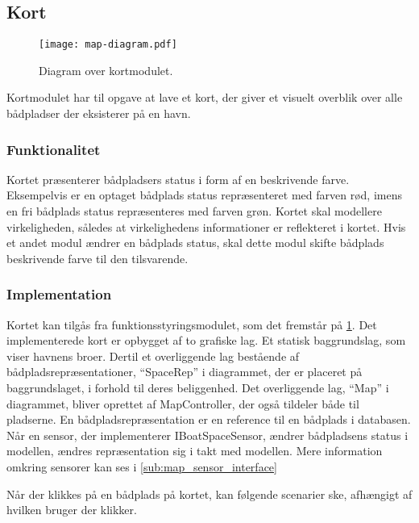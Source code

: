 \subsection{Kort}
\label{sub:kort}

\begin{figure}
  \centering
  \texttt{[image: map-diagram.pdf]}
  \caption{Diagram over kortmodulet.}
  \label{fig:map_diagram}
\end{figure}

Kortmodulet har til opgave at lave et kort, der giver et visuelt overblik over alle bådpladser der eksisterer på en havn.

\subsubsection{Funktionalitet}
\label{ssub:kort_funktionalitet}

Kortet præsenterer bådpladsers status i form af en beskrivende farve. Eksempelvis er en optaget bådplads status repræsenteret med farven rød, imens en fri bådplads status repræsenteres med farven grøn. Kortet skal modellere virkeligheden, således at virkelighedens informationer er reflekteret i kortet. Hvis et andet modul ændrer en bådplads status, skal dette modul skifte bådplads beskrivende farve til den tilsvarende.

\subsubsection{Implementation}
\label{ssub:kort_implementation}

Kortet kan tilgås fra funktionsstyringsmodulet, som det fremstår på \cref{fig:map_diagram}. Det implementerede kort er opbygget af to grafiske lag. Et statisk baggrundslag, som viser havnens broer. Dertil et overliggende lag bestående af bådpladsrepræsentationer, \enquote{SpaceRep} i diagrammet, der er placeret på baggrundslaget, i forhold til deres beliggenhed. Det overliggende lag, \enquote{Map} i diagrammet, bliver oprettet af MapController, der også tildeler både til pladserne. En bådpladsrepræsentation er en reference til en bådplads i databasen. Når en sensor, der implementerer IBoatSpaceSensor, ændrer bådpladsens status i modellen, ændres repræsentation sig i takt med modellen. Mere information omkring sensorer kan ses i \cref{sub:map_sensor_interface}

Når der klikkes på en bådplads på kortet, kan følgende scenarier ske, afhængigt af hvilken bruger der klikker.

